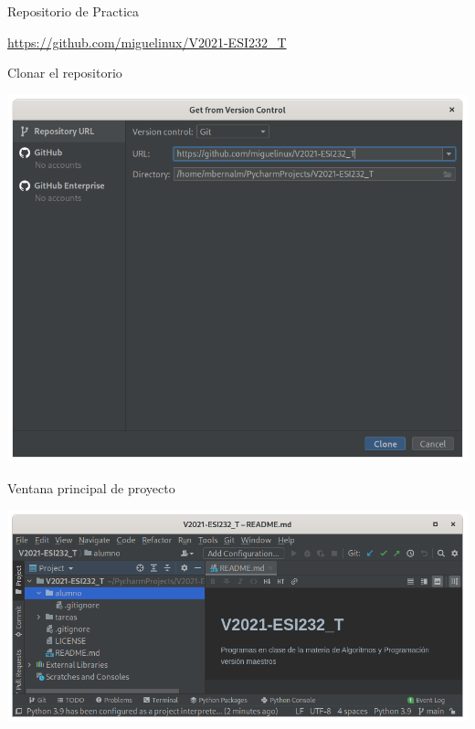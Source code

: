 \begin{frame}[c]{Repositorio de Practica}
    \begin{center}
        \href{https://github.com/miguelinux/V2021-ESI232_T}{
            https://github.com/miguelinux/V2021-ESI232\_T}
    \end{center}
\end{frame}

\begin{frame}[c]{Clonar el repositorio}
    \begin{center}
        \includegraphics[scale=0.3]{img/url-to-clone.png}
    \end{center}
\end{frame}

\begin{frame}[c]{Ventana principal de proyecto}
    \begin{center}
        \includegraphics[scale=0.5]{img/clonado.png}
    \end{center}
\end{frame}


